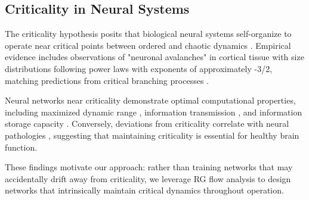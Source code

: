 \subsection{Criticality in Neural Systems}

The criticality hypothesis posits that biological neural systems self-organize to operate near critical points between ordered and chaotic dynamics \cite{Beggsetal2003, Beggsetal2012}. Empirical evidence includes observations of "neuronal avalanches" in cortical tissue with size distributions following power laws with exponents of approximately -3/2, matching predictions from critical branching processes \cite{Beggsetal2003}. 

Neural networks near criticality demonstrate optimal computational properties, including maximized dynamic range \cite{Kinouchietal2006, Shewetal2009}, information transmission \cite{Beggsetal2012}, and information storage capacity \cite{Bertschingeretal2004}. Conversely, deviations from criticality correlate with neural pathologies \cite{Meiseletal2011}, suggesting that maintaining criticality is essential for healthy brain function.

These findings motivate our approach: rather than training networks that may accidentally drift away from criticality, we leverage RG flow analysis to design networks that intrinsically maintain critical dynamics throughout operation.